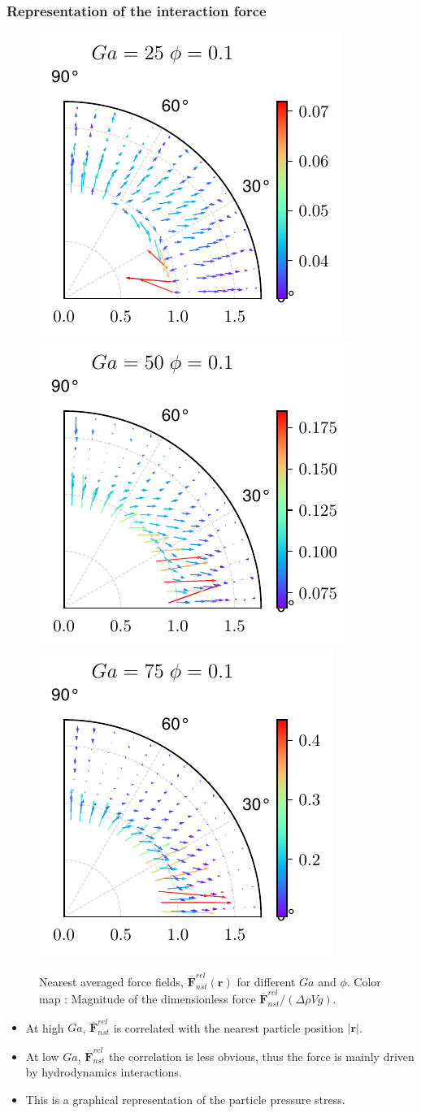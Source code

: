 \documentclass{sintefbeamer}
\newcommand{\nstrelavg}[1]{\overline{#1}_{nst}^{rel}}
\begin{document}
\begin{frame}
  \frametitle{Representation of the interaction force}

  \begin{figure}
    
    \includegraphics[height=0.25\textwidth]{image/HOMOGENEOUS/fDrop/F_mu_r_0_1_Ga_25_PHI_0_1.pdf}
    \includegraphics[height=0.25\textwidth]{image/HOMOGENEOUS/fDrop/F_mu_r_0_1_Ga_50_PHI_0_1.pdf}
    \includegraphics[height=0.25\textwidth]{image/HOMOGENEOUS/fDrop/F_mu_r_0_1_Ga_75_PHI_0_1.pdf}
    
    \caption{Nearest averaged force fields, $\nstrelavg{\textbf{F}}(\textbf{r})$ for different $Ga$ and $\phi$. 
    Color map : Magnitude of the dimensionless force  $\nstrelavg{\textbf{F}} / (\Delta \rho V g)$.}
  \end{figure}

\begin{itemize}
  \item At high $Ga$, $\nstrelavg{\textbf{F}}$ is correlated with the nearest particle position $|\textbf{r}|$. 
  \item At low $Ga$, $\nstrelavg{\textbf{F}}$ the correlation is less obvious, thus the force is mainly driven by hydrodynamics interactions. 
  \item This is a graphical representation of the particle pressure stress.  
\end{itemize}
\end{frame}
\end{document}
